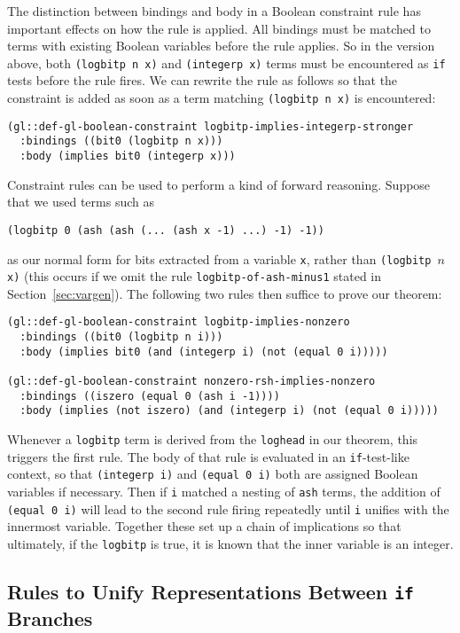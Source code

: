 \documentclass[submission,copyright,creativecommons]{eptcs}
\begin{document}
The distinction between bindings and body in a Boolean constraint rule
has important effects on how the rule is applied.  All bindings must be
matched to terms with existing Boolean variables before the rule applies.  So in the version
above, both \texttt{(logbitp n x)} and \texttt{(integerp x)} terms
must be encountered as \texttt{if} tests before the rule fires.
We can rewrite the rule as follows so that the constraint is added as
soon as a term matching \texttt{(logbitp n x)} is encountered:
\begin{verbatim}
(gl::def-gl-boolean-constraint logbitp-implies-integerp-stronger
  :bindings ((bit0 (logbitp n x)))
  :body (implies bit0 (integerp x)))
\end{verbatim}

Constraint rules can be used to perform a kind of forward reasoning.
Suppose that we used terms such as
\begin{verbatim}
(logbitp 0 (ash (ash (... (ash x -1) ...) -1) -1))
\end{verbatim}
\noindent as our normal form for bits extracted from a variable
\texttt{x}, rather than \texttt{(logbitp $n$ x)} (this occurs if we
omit the rule \texttt{logbitp-of-ash-minus1} stated in Section~\ref{sec:vargen}).  The
following two rules then suffice to prove our theorem:
\begin{verbatim}
(gl::def-gl-boolean-constraint logbitp-implies-nonzero
  :bindings ((bit0 (logbitp n i)))
  :body (implies bit0 (and (integerp i) (not (equal 0 i)))))

(gl::def-gl-boolean-constraint nonzero-rsh-implies-nonzero
  :bindings ((iszero (equal 0 (ash i -1))))
  :body (implies (not iszero) (and (integerp i) (not (equal 0 i)))))
\end{verbatim}
\noindent Whenever a \texttt{logbitp} term is derived from the
\texttt{loghead} in our theorem, this triggers the first rule.  The
body of that rule is evaluated in an \texttt{if}-test-like context, so
that \texttt{(integerp i)} and \texttt{(equal 0 i)} both are assigned
Boolean variables if necessary.  Then if \texttt{i} matched a nesting
of \texttt{ash} terms, the addition of \texttt{(equal 0 i)} will lead
to the second rule firing repeatedly until \texttt{i} unifies with the
innermost variable.  Together these set up a chain of implications so
that ultimately, if the \texttt{logbitp} is true, it is known that the
inner variable is an integer.


\subsection{Rules to Unify Representations Between \texttt{if} Branches}
\label{sec:branchmerge}
\end{document}
